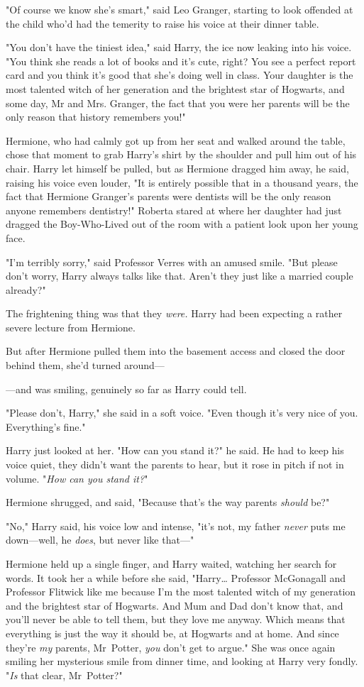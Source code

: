 "Of course we know she's smart," said Leo Granger, starting to look offended at
the child who'd had the temerity to raise his voice at their dinner table.

"You don't have the tiniest idea," said Harry, the ice now leaking into his
voice. "You think she reads a lot of books and it's cute, right? You see a
perfect report card and you think it's good that she's doing well in class.
Your daughter is the most talented witch of her generation and the brightest
star of Hogwarts, and some day, Mr and Mrs. Granger, the fact that you were her
parents will be the only reason that history remembers you!"

Hermione, who had calmly got up from her seat and walked around the table,
chose that moment to grab Harry's shirt by the shoulder and pull him out of his
chair. Harry let himself be pulled, but as Hermione dragged him away, he said,
raising his voice even louder, "It is entirely possible that in a thousand
years, the fact that Hermione Granger's parents were dentists will be the only
reason anyone remembers dentistry!"
\later
Roberta stared at where her daughter had just dragged the Boy-Who-Lived out of
the room with a patient look upon her young face.

"I'm terribly sorry," said Professor Verres with an amused smile. "But please
don't worry, Harry always talks like that. Aren't they just like a married
couple already?"

The frightening thing was that they \emph{were.}
\later
Harry had been expecting a rather severe lecture from Hermione.

But after Hermione pulled them into the basement access and closed the door
behind them, she'd turned around---

---and was smiling, genuinely so far as Harry could tell.

"Please don't, Harry," she said in a soft voice. "Even though it's very nice of
you. Everything's fine."

Harry just looked at her. "How can you stand it?" he said. He had to keep his
voice quiet, they didn't want the parents to hear, but it rose in pitch if not
in volume. "\emph{How can you stand it?}"

Hermione shrugged, and said, "Because that's the way parents \emph{should} be?"

"No," Harry said, his voice low and intense, "it's not, my father \emph{never}
puts me down---well, he \emph{does}, but never like that---"

Hermione held up a single finger, and Harry waited, watching her search for
words. It took her a while before she said, "Harry{\ldots} Professor McGonagall
and Professor Flitwick like me because I'm the most talented witch of my
generation and the brightest star of Hogwarts. And Mum and Dad don't know that,
and you'll never be able to tell them, but they love me anyway. Which means
that everything is just the way it should be, at Hogwarts and at home. And
since they're \emph{my} parents, Mr~Potter, \emph{you} don't get to argue."
She was once again smiling her mysterious smile from dinner time, and looking at
Harry very fondly. "\emph{Is} that clear, Mr~Potter?"


